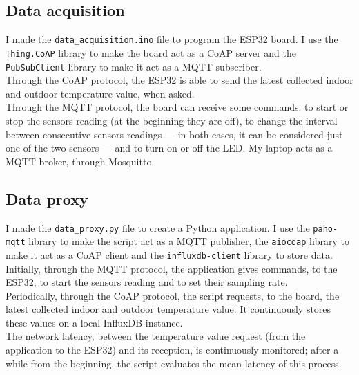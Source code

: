\documentclass[conference]{IEEEtran}
\begin{document}
\subsection{Data acquisition}
I made the \texttt{data\_acquisition.ino} file to program the ESP32 board. I use the \texttt{Thing.CoAP} library to make the board act as a CoAP server and the \texttt{PubSubClient} library to make it act as a MQTT subscriber.\\
Through the CoAP protocol, the ESP32 is able to send the latest collected indoor and outdoor temperature value, when asked.\\
Through the MQTT protocol, the board can receive some commands: to start or stop the sensors reading (at the beginning they are off), to change the interval between consecutive sensors readings --- in both cases, it can be considered just one of the two sensors --- and to turn on or off the LED. My laptop acts as a MQTT broker, through Mosquitto.

\subsection{Data proxy}
I made the \texttt{data\_proxy.py} file to create a Python application. I use the \texttt{paho-mqtt} library to make the script act as a MQTT publisher, the \texttt{aiocoap} library to make it act as a CoAP client and the \texttt{influxdb-client} library to store data.\\
Initially, through the MQTT protocol, the application gives commands, to the ESP32, to start the sensors reading and to set their sampling rate.\\
Periodically, through the CoAP protocol, the script requests, to the board, the latest collected indoor and outdoor temperature value. It continuously stores these values on a local InfluxDB instance.\\
The network latency, between the temperature value request (from the application to the ESP32) and its reception, is continuously monitored; after a while from the beginning, the script evaluates the mean latency of this process.
\end{document}
